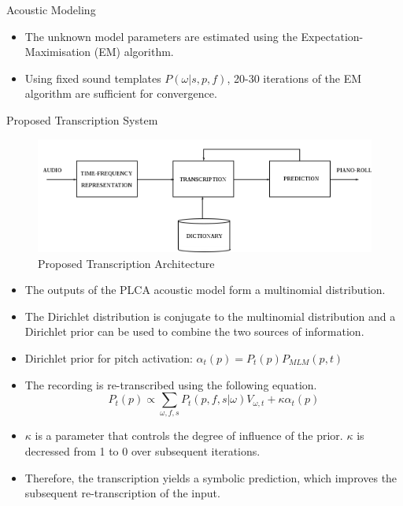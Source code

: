 \documentclass[final]{beamer}
\newlength{\onecolwid}
\newlength{\twocolwid}
\begin{document}
\begin{frame}[t]
\begin{columns}[t]
\begin{column}{\twocolwid}
\begin{columns}[t,totalwidth=\twocolwid]
\begin{column}{\onecolwid}
\begin{block}{Acoustic Modeling}
\begin{itemize}
\item The unknown model parameters are estimated using the Expectation-Maximisation (EM) algorithm.
\item Using fixed sound templates $P(\omega|s,p,f)$, 20-30 iterations of the EM algorithm are sufficient for convergence. 
\end{itemize}

\end{block}

\begin{block}{Proposed Transcription System}
\begin{figure}
\includegraphics[width=0.9\linewidth]{system.png}
\caption{Proposed Transcription Architecture}
\end{figure}

\begin{itemize}
\item The outputs of the PLCA acoustic model form a multinomial distribution. 
\item The Dirichlet distribution is conjugate to the multinomial distribution and a Dirichlet prior can be used to combine the two sources of information.
\item Dirichlet prior for pitch activation: $\alpha_t(p) = P_t(p)P_{MLM}(p,t)$
\item The recording is re-transcribed using the following equation.
\begin{equation}
 P_{t}(p) \propto \sum_{\omega,f,s}P_{t}(p,f,s|\omega)V_{\omega,t}+\kappa\alpha_{t}(p) \label{eq:modifiedMStepPitchActivation} 
\end{equation}
\item $\kappa$ is a parameter that controls the degree of influence of the prior. $\kappa$ is decressed from 1 to 0 over subsequent iterations.
\item Therefore, the transcription yields a symbolic prediction, which improves the subsequent re-transcription of the input. 
\end{itemize}
\end{block}
\end{column} %


\end{columns}
\end{column}
\end{columns}
\end{frame}
\end{document}
